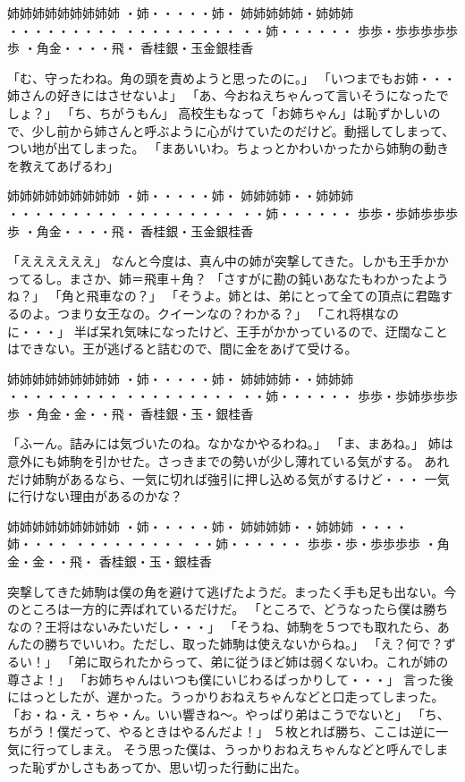 姉姉姉姉姉姉姉姉姉
・姉・・・・・姉・
姉姉姉姉姉・姉姉姉
・・・・・・・・・
・・・・・・・・・
・・姉・・・・・・
歩歩・歩歩歩歩歩歩
・角金・・・・飛・
香桂銀・玉金銀桂香

「む、守ったわね。角の頭を責めようと思ったのに。」
「いつまでもお姉・・・姉さんの好きにはさせないよ」
「あ、今おねえちゃんって言いそうになったでしょ？」
「ち、ちがうもん」
高校生もなって「お姉ちゃん」は恥ずかしいので、少し前から姉さんと呼ぶように心がけていたのだけど。動揺してしまって、つい地が出てしまった。
「まあいいわ。ちょっとかわいかったから姉駒の動きを教えてあげるわ」

姉姉姉姉姉姉姉姉姉
・姉・・・・・姉・
姉姉姉姉・・姉姉姉
・・・・・・・・・
・・・・・・・・・
・・姉・・・・・・
歩歩・歩姉歩歩歩歩
・角金・・・・飛・
香桂銀・玉金銀桂香

「ええええええ」
なんと今度は、真ん中の姉が突撃してきた。しかも王手かかってるし。まさか、姉＝飛車＋角？
「さすがに勘の鈍いあなたもわかったようね？」
「角と飛車なの？」
「そうよ。姉とは、弟にとって全ての頂点に君臨するのよ。つまり女王なの。クイーンなの？わかる？」
「これ将棋なのに・・・」
半ば呆れ気味になったけど、王手がかかっているので、迂闊なことはできない。王が逃げると詰むので、間に金をあげて受ける。

姉姉姉姉姉姉姉姉姉
・姉・・・・・姉・
姉姉姉姉・・姉姉姉
・・・・・・・・・
・・・・・・・・・
・・姉・・・・・・
歩歩・歩姉歩歩歩歩
・角金・金・・飛・
香桂銀・玉・銀桂香

「ふーん。詰みには気づいたのね。なかなかやるわね。」
「ま、まあね。」
姉は意外にも姉駒を引かせた。さっきまでの勢いが少し薄れている気がする。
あれだけ姉駒があるなら、一気に切れば強引に押し込める気がするけど・・・
一気に行けない理由があるのかな？

姉姉姉姉姉姉姉姉姉
・姉・・・・・姉・
姉姉姉姉・・姉姉姉
・・・・姉・・・・
・・・・・・・・・
・・姉・・・・・・
歩歩・歩・歩歩歩歩
・角金・金・・飛・
香桂銀・玉・銀桂香

突撃してきた姉駒は僕の角を避けて逃げたようだ。まったく手も足も出ない。今のところは一方的に弄ばれているだけだ。
「ところで、どうなったら僕は勝ちなの？王将はないみたいだし・・・」
「そうね、姉駒を５つでも取れたら、あんたの勝ちでいいわ。ただし、取った姉駒は使えないからね。」
「え？何で？ずるい！」
「弟に取られたからって、弟に従うほど姉は弱くないわ。これが姉の尊さよ！」
「お姉ちゃんはいつも僕にいじわるばっかりして・・・」
言った後にはっとしたが、遅かった。うっかりおねえちゃんなどと口走ってしまった。
「お・ね・え・ちゃ・ん。いい響きね～。やっぱり弟はこうでないと」
「ち、ちがう！僕だって、やるときはやるんだよ！」
５枚とれば勝ち、ここは逆に一気に行ってしまえ。
そう思った僕は、うっかりおねえちゃんなどと呼んでしまった恥ずかしさもあってか、思い切った行動に出た。

